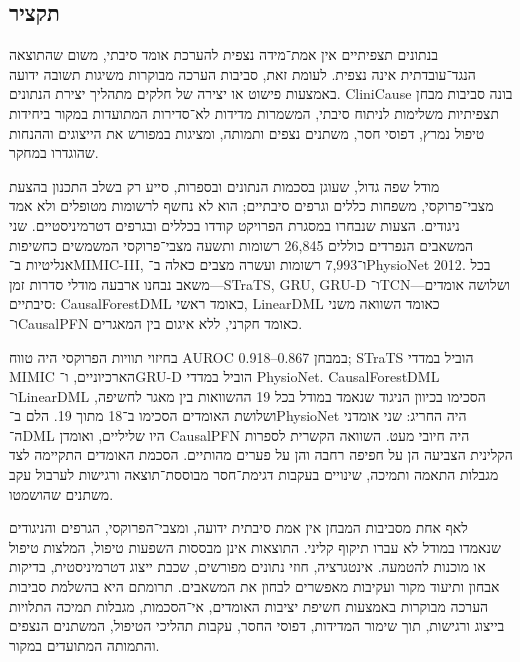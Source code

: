 \begin{hebrew}
\begingroup
\let\raggedright\raggedleft
\chapter*{תקציר}
\endgroup
\begin{english}
\end{english}

\raggedleft
\setlength{\parindent}{0pt}
\setlength{\parskip}{0.75\baselineskip}

בנתונים תצפיתיים אין אמת־מידה נצפית להערכת אומד סיבתי, משום שהתוצאה הנגד־עובדתית אינה נצפית. לעומת זאת, סביבות הערכה מבוקרות משיגות תשובה ידועה באמצעות פישוט או יצירה של חלקים מתהליך יצירת הנתונים. \textenglish{CliniCause} בונה סביבות מבחן תצפיתיות משלימות לניתוח סיבתי, המשמרות מדידות לא־סדירות המתועדות במקור ביחידות טיפול נמרץ, דפוסי חסר, משתנים נצפים ותמותה, ומציגות במפורש את הייצוגים וההנחות שהוגדרו במחקר.

מודל שפה גדול, שעוגן בסכמות הנתונים ובספרות, סייע רק בשלב התכנון בהצעת מצבי־פרוקסי, משפחות כללים וגרפים סיבתיים; הוא לא נחשף לרשומות מטופלים ולא אמד ניגודים. הצעות שנבחרו במסגרת הפרויקט קודדו בכללים ובגרפים דטרמיניסטיים. שני המשאבים הנפרדים כוללים 26,845 רשומות ותשעה מצבי־פרוקסי המשמשים כחשיפות אנליטיות ב־\textenglish{MIMIC-III}, ו־7,993 רשומות ועשרה מצבים כאלה ב־\textenglish{PhysioNet 2012}. בכל משאב נבחנו ארבעה מודלי סדרות זמן—\textenglish{STraTS}, ‏\textenglish{GRU}, ‏\textenglish{GRU-D} ו־\textenglish{TCN}—ושלושה אומדים סיבתיים: \textenglish{CausalForestDML} כאומד ראשי, \textenglish{LinearDML} כאומד השוואה משני ו־\textenglish{CausalPFN} כאומד חקרני, ללא איגום בין המאגרים.

בחיזוי תוויות הפרוקסי היה טווח \textenglish{AUROC} במבחן \textenglish{0.867--0.918}; \textenglish{STraTS} הוביל במדדי \textenglish{MIMIC} הארכיוניים, ו־\textenglish{GRU-D} הוביל במדדי \textenglish{PhysioNet}. \textenglish{CausalForestDML} ו־\textenglish{LinearDML} הסכימו בכיוון הניגוד שנאמד במודל בכל 19 ההשוואות בין מאגר לחשיפה, ושלושת האומדים הסכימו ב־18 מתוך 19. הלם ב־\textenglish{PhysioNet} היה החריג: שני אומדני ה־\textenglish{DML} היו שליליים, ואומדן \textenglish{CausalPFN} היה חיובי מעט. השוואה הקשרית לספרות הקלינית הצביעה הן על חפיפה רחבה והן על פערים מהותיים. הסכמת האומדים התקיימה לצד מגבלות התאמה ותמיכה, שינויים בעקבות דגימת־חסר מבוססת־תוצאה ורגישות לערבול עקב משתנים שהושמטו.

לאף אחת מסביבות המבחן אין אמת סיבתית ידועה, ומצבי־הפרוקסי, הגרפים והניגודים שנאמדו במודל לא עברו תיקוף קליני. התוצאות אינן מבססות השפעות טיפול, המלצות טיפול או מוכנות להטמעה. אינטגרציה, חוזי נתונים מפורשים, שכבת ייצוג דטרמיניסטית, בדיקות אבחון ותיעוד מקור ועקיבות מאפשרים לבחון את המשאבים. תרומתם היא בהשלמת סביבות הערכה מבוקרות באמצעות חשיפת יציבות האומדים, אי־הסכמות, מגבלות תמיכה התלויות בייצוג ורגישות, תוך שימור המדידות, דפוסי החסר, עקבות תהליכי הטיפול, המשתנים הנצפים והתמותה המתועדים במקור.
\end{hebrew}
